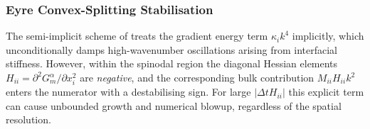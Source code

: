{\color{blue}
\subsubsection{Eyre Convex-Splitting Stabilisation}
\label{sec:eyre}

The semi-implicit scheme of  treats the gradient energy term $\kappa_i k^4$ implicitly, which unconditionally damps high-wavenumber oscillations arising from interfacial stiffness. However, within the spinodal region the diagonal Hessian elements $H_{ii} = \partial^2 G^\alpha_m / \partial x_i^2$ are \emph{negative}, and the corresponding bulk contribution $M_{ii} H_{ii} k^2$ enters the numerator with a destabilising sign.  For large $|\Delta t H_{ii}|$ this explicit term can cause unbounded growth and numerical blowup, regardless of the spatial resolution.

}
